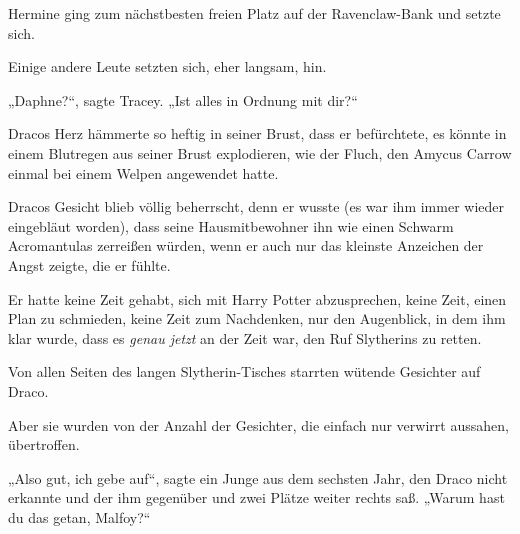 Hermine ging zum nächstbesten freien Platz auf der Ravenclaw-Bank und setzte sich.

Einige andere Leute setzten sich, eher langsam, hin.

„Daphne?“, sagte Tracey. „Ist alles in Ordnung mit dir?“

\later

Dracos Herz hämmerte so heftig in seiner Brust, dass er befürchtete, es könnte in einem Blutregen aus seiner Brust explodieren, wie der Fluch, den Amycus Carrow einmal bei einem Welpen angewendet hatte.

Dracos Gesicht blieb völlig beherrscht, denn er wusste (es war ihm immer wieder eingebläut worden), dass seine Hausmitbewohner ihn wie einen Schwarm Acromantulas zerreißen würden, wenn er auch nur das kleinste Anzeichen der Angst zeigte, die er fühlte.

Er hatte keine Zeit gehabt, sich mit Harry Potter abzusprechen, keine Zeit, einen Plan zu schmieden, keine Zeit zum Nachdenken, nur den Augenblick, in dem ihm klar wurde, dass es \emph{genau jetzt} an der Zeit war, den Ruf Slytherins zu retten.

Von allen Seiten des langen Slytherin-Tisches starrten wütende Gesichter auf Draco.

Aber sie wurden von der Anzahl der Gesichter, die einfach nur verwirrt aussahen, übertroffen.

„Also gut, ich gebe auf“, sagte ein Junge aus dem sechsten Jahr, den Draco nicht erkannte und der ihm gegenüber und zwei Plätze weiter rechts saß. „Warum hast du das getan, Malfoy?“

